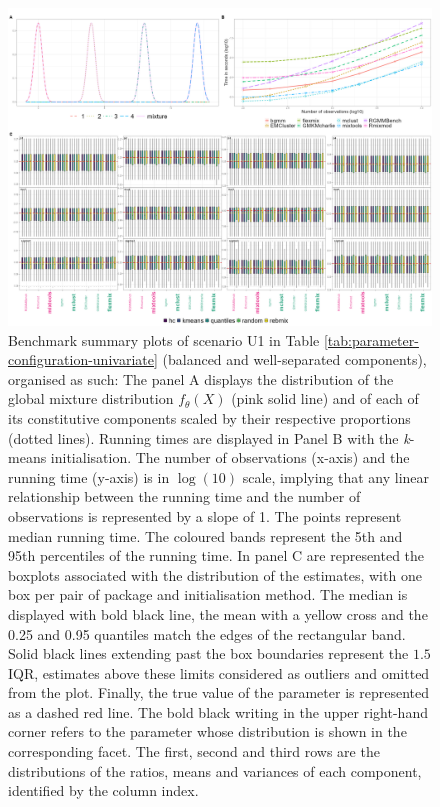 \newpage

\begin{figure}

{\centering \includegraphics[width=1\linewidth]{./figs/univariate/univariate_balanced_separated} 

}

\caption{Benchmark summary plots of scenario U1 in Table \ref{tab:parameter-configuration-univariate} (balanced and well-separated components), organised as such:
The panel A displays the distribution of the global mixture distribution $f_{\theta}(X)$
(pink solid line) and of each of its constitutive components scaled by
their respective proportions (dotted lines).
Running times are displayed in Panel B with the \textit{k}-means initialisation. The number of observations
(x-axis) and the running time (y-axis) is in $\log(10)$ scale, implying
that any linear relationship between the running time and the number of
observations is represented by a slope of 1. The points represent median
running time. The coloured bands represent the 5th and 95th percentiles
of the running time.
In panel C are represented the boxplots associated with the distribution of the estimates, with one box per pair of package and initialisation method. The median is displayed with bold
black line, the mean with a yellow cross and the 0.25 and 0.95 quantiles
match the edges of the rectangular band. Solid black lines extending
past the box boundaries represent the $1.5$ IQR, estimates above these
limits considered as outliers and omitted from the plot. Finally, the
true value of the parameter is represented as a dashed red line. The bold black writing in the upper right-hand corner refers to the parameter whose distribution is shown in the corresponding facet. The first, second and third rows are the distributions of the ratios, means and variances of each component, identified by the column index.}\label{fig:four-component-balanced-separated}
\end{figure}

